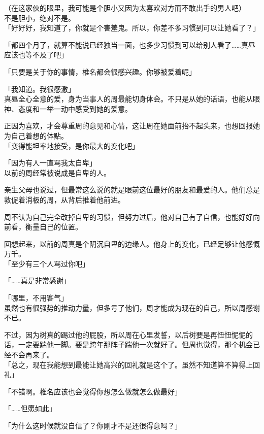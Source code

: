 （在这家伙的眼里，我可能是个胆小又因为太喜欢对方而不敢出手的男人吧）\\

不是胆小，绝对不是。\\

「好好好，我知道了，你就是个害羞鬼。所以，你差不多习惯到可以让她看了？」

「都四个月了，就算不能说已经独当一面，也多少习惯到可以给别人看了……真昼应该也等不及了吧」

「只要是关于你的事情，椎名都会很感兴趣。你够被爱着呢」

「我知道。我很感激」\\

真昼全心全意的爱，身为当事人的周最能切身体会。不只是从她的话语，也能从眼神、态度和一举一动中感受到她的爱意。

正因为喜欢，才会尊重周的意见和心情，这让周在她面前抬不起头来，也想回报她为自己着想的体贴。\\

「变得能坦率地接受，是你最大的变化吧」

「因为有人一直骂我太自卑」\\

以前的周经常被说成是自卑的人。

亲生父母也说过，但最常这么说的就是眼前这位最好的朋友和最爱的人。他们总是敦促着消极的周，从背后推着他前进。

周不认为自己完全改掉自卑的习惯，但努力过后，他对自己有了自信，也能好好向前看，衡量自己的位置。

回想起来，以前的周真是个阴沉自卑的边缘人。他身上的变化，已经足够让他感慨万千。\\

「至少有三个人骂过你吧」

「……真是非常感谢」

「哪里，不用客气」\\

虽然也有很强势的推动力量，但多亏了他们，周才能成为现在的自己，所以周感谢不已。

不过，因为树真的踢过他的屁股，所以周在心里发誓，以后树要是再忸忸怩怩的话，一定要踹他一脚。要是跨年那阵子踹他一次就好了。但周也觉得，那个机会已经不会再来了。\\

「总之，现在我能想到最能让她高兴的回礼就是这个了。虽然不知道算不算得上回礼」

「不错啊。椎名应该也会觉得你想怎么做就怎么做最好」

「……但愿如此」

「为什么这时候就没自信了？你刚才不是还很得意吗？」

